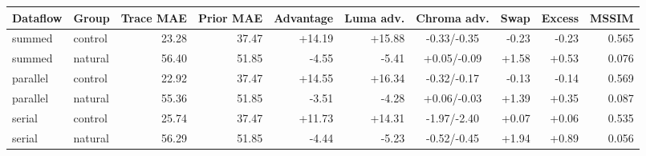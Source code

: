 \begin{tabular}{llrrrrcrrr}
\hline
Dataflow & Group & Trace MAE & Prior MAE & Advantage & Luma adv. & Chroma adv. & Swap & Excess & MSSIM \\
\hline
summed & control & 23.28 & 37.47 & +14.19 & +15.88 & -0.33/-0.35 & -0.23 & -0.23 & 0.565 \\
summed & natural & 56.40 & 51.85 & -4.55 & -5.41 & +0.05/-0.09 & +1.58 & +0.53 & 0.076 \\
parallel & control & 22.92 & 37.47 & +14.55 & +16.34 & -0.32/-0.17 & -0.13 & -0.14 & 0.569 \\
parallel & natural & 55.36 & 51.85 & -3.51 & -4.28 & +0.06/-0.03 & +1.39 & +0.35 & 0.087 \\
serial & control & 25.74 & 37.47 & +11.73 & +14.31 & -1.97/-2.40 & +0.07 & +0.06 & 0.535 \\
serial & natural & 56.29 & 51.85 & -4.44 & -5.23 & -0.52/-0.45 & +1.94 & +0.89 & 0.056 \\
\hline
\end{tabular}

